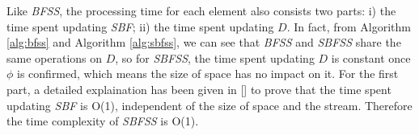 \documentclass[conference]{IEEEtran}
\begin{document}
\begin{IEEEproof}
Like \emph{BFSS}, the processing time for each element also consists two parts: i) the time spent updating \emph{SBF}; ii) the time spent updating $D$. In fact, from Algorithm \ref{alg:bfss} and Algorithm \ref{alg:sbfss}, we can see that \emph{BFSS} and \emph{SBFSS} share the same operations on $D$, so for \emph{SBFSS}, the time spent updating $D$ is constant once $\phi$ is confirmed, which means the size of space has no impact on it. For the first part, a detailed explaination has been given in [] to prove that the time spent updating \emph{SBF} is O(1), independent of the size of space and the stream. Therefore the time complexity of \emph{SBFSS} is O(1).
\end{IEEEproof}
%
%



%
%
\end{document}
